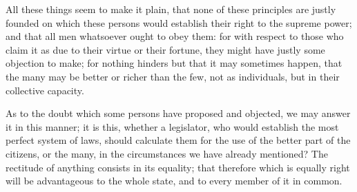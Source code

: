 All these things seem to make it plain, that none of these principles are
justly founded on which these persons would establish their right to the
supreme power; and that all men whatsoever ought to obey them: for with
respect to those who claim it as due to their virtue or their fortune,
they might have justly some objection to make; for nothing hinders but
that it may sometimes happen, that the many may be better or richer than
the few, not as individuals, but in their collective capacity.

As to the doubt which some persons have proposed and objected, we may
answer it in this manner; it is this, whether a legislator, who would
establish the most perfect system of laws, should calculate them for the
use of the better part of the citizens, or the many, in the circumstances
we have already mentioned? The rectitude of anything consists in its
equality; that therefore which is equally right will be advantageous to
the whole state, and to every member of it in common.

